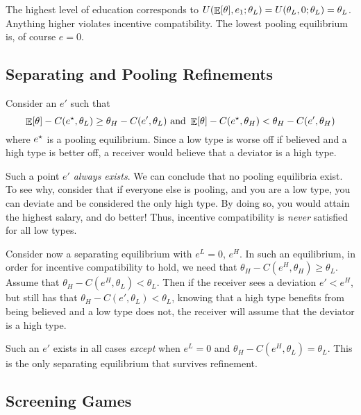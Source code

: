 \documentclass[12pt]{article}
\begin{document}
\begin{remark}
	The highest level of education corresponds to $U(\mathop{\mathbb{E}}[\theta],e_1;\theta_L) = U(\theta_L,0;\theta_L) = \theta_L$. Anything higher violates incentive compatibility. The lowest pooling equilibrium is, of course $e = 0$. 
\end{remark}


\subsection{Separating and Pooling Refinements}

\begin{example}
	Consider an $e'$ such that
	\[
	\mathop{\mathbb{E}}[\theta] - C(e^\star,\theta_L) \ge \theta_H - C(e',\theta_L) \text{ and } \mathop{\mathbb{E}}[\theta] - C(e^\star,\theta_H) < \theta_H - C(e',\theta_H)
	\]
	where $e^\star$ is a pooling equilibrium. Since a low type is worse off if believed and a high type is better off, a receiver would believe that a deviator is a high type. 
\end{example}
\begin{remark}
	Such a point $e'$ \emph{always exists}. We can conclude that no pooling equilibria exist. To see why, consider that if everyone else is pooling, and you are a low type, you can deviate and be considered the only high type. By doing so, you would attain the highest salary, and do better! Thus, incentive compatibility is \emph{never} satisfied for all low types.
\end{remark}

\begin{example}
	Consider now a separating equilibrium with $e^L = 0$, $e^H$. In such an equilibrium, in order for incentive compatibility to hold, we need that $\theta_H - C(e^H,\theta_H) \ge \theta_L$. Assume that $\theta_H - C(e^H,\theta_L) < \theta_L$. Then if the receiver sees a deviation $e' < e^H$, but still has that $\theta_H - C(e',\theta_L) < \theta_L$, knowing that a high type benefits from being believed and a low type does not, the receiver will assume that the deviator is a high type. 
\end{example}

\begin{remark}
	Such an $e'$ exists in all cases \emph{except} when $e^L = 0$ and $\theta_H - C(e^H ,\theta_L) = \theta_L$. This is the only separating equilibrium that survives refinement. 
\end{remark}

\subsection{Screening Games}
\end{document}
